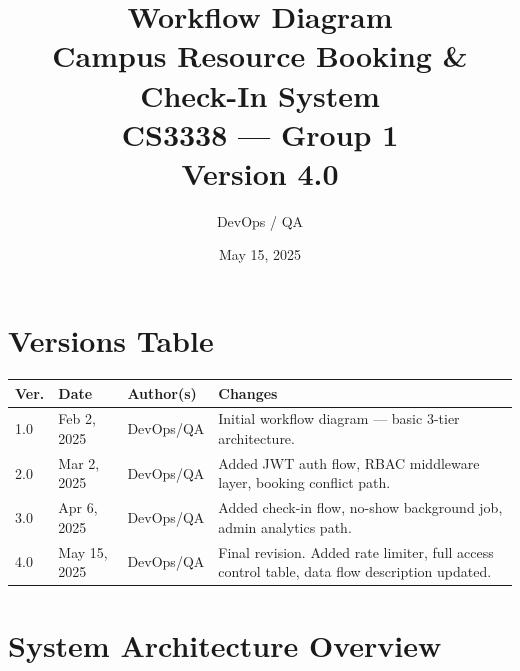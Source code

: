 \documentclass[12pt]{article}
\title{
    \vspace{2cm}
    {\Large Workflow Diagram} \\[1em]
    {\LARGE \textbf{Campus Resource Booking \& Check-In System}} \\[2em]
    {\large CS3338 --- Group 1} \\[0.5em]
    {\normalsize Version 4.0}
    \vspace{2cm}
}
\author{DevOps / QA}
\date{May 15, 2025}
\begin{document}
\maketitle
\thispagestyle{empty}
\newpage

\section*{Versions Table}

\begin{longtable}{|p{1.4cm}|p{2.4cm}|p{3.5cm}|p{6.5cm}|}
\hline
\textbf{Ver.} & \textbf{Date} & \textbf{Author(s)} & \textbf{Changes} \\
\hline
1.0 & Feb 2, 2025  & DevOps/QA & Initial workflow diagram --- basic 3-tier architecture. \\
\hline
2.0 & Mar 2, 2025  & DevOps/QA & Added JWT auth flow, RBAC middleware layer, booking conflict path. \\
\hline
3.0 & Apr 6, 2025  & DevOps/QA & Added check-in flow, no-show background job, admin analytics path. \\
\hline
4.0 & May 15, 2025 & DevOps/QA & Final revision. Added rate limiter, full access control table, data flow description updated. \\
\hline
\end{longtable}
\newpage

\section*{System Architecture Overview}
\end{document}

